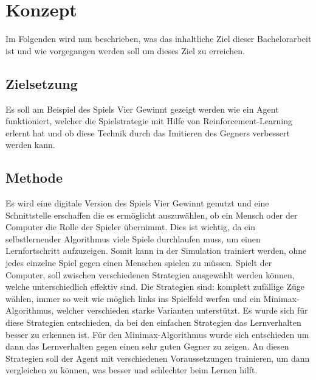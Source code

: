 \chapter{Konzept}%

\label{cha:Konzept}

Im Folgenden wird nun beschrieben, was das inhaltliche Ziel dieser Bachelorarbeit ist und wie vorgegangen werden soll um dieses Ziel zu erreichen.

\section{Zielsetzung}
Es soll am Beispiel des Spiels Vier Gewinnt gezeigt werden wie ein Agent funktioniert, welcher die Spielstrategie mit Hilfe von Reinforcement-Learning erlernt hat und ob diese Technik durch das Imitieren des Gegners verbessert werden kann.

\section{Methode}
%
Es wird eine digitale Version des Spiels Vier Gewinnt genutzt und eine Schnittstelle erschaffen die es ermöglicht auszuwählen, ob ein Mensch oder der Computer die Rolle der Spieler übernimmt. Dies ist wichtig, da ein selbstlernender Algorithmus viele Spiele durchlaufen muss, um einen Lernfortschritt aufzuzeigen. Somit kann in der Simulation trainiert werden, ohne jedes einzelne Spiel gegen einen Menschen spielen zu müssen. Spielt der Computer, soll zwischen verschiedenen Strategien ausgewählt werden können, welche unterschiedlich effektiv sind. Die Strategien sind: komplett zufällige Züge wählen, immer so weit wie möglich links ins Spielfeld werfen und ein Minimax-Algorithmus, welcher verschieden starke Varianten unterstützt. Es wurde sich für diese Strategien entschieden, da bei den einfachen Strategien das Lernverhalten besser zu erkennen ist. Für den Minimax-Algorithmus wurde sich entschieden um dann das Lernverhalten gegen einen sehr guten Gegner zu zeigen.
An diesen Strategien soll der Agent mit verschiedenen Voraussetzungen trainieren, um dann vergleichen zu können, was besser und schlechter beim Lernen hilft.
%

\newpage

